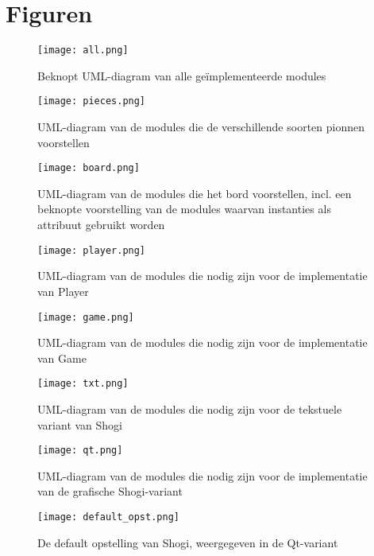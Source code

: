 \documentclass[a4paper,11pt,oneside, titlepage]{article}
\begin{document}
\section{Figuren}

\begin{figure}[hbp]
\texttt{[image: all.png]}
\caption{Beknopt UML-diagram van alle ge\"implementeerde modules}
\end{figure}
\clearpage

\begin{figure}[hbp]
\texttt{[image: pieces.png]}
\caption{UML-diagram van de modules die de verschillende soorten pionnen voorstellen}
\end{figure}
\clearpage

\begin{figure}[hbp]
\texttt{[image: board.png]}
\caption{UML-diagram van de modules die het bord voorstellen, incl. een beknopte voorstelling van de modules waarvan instanties als attribuut gebruikt worden}
\end{figure}
\clearpage

\begin{figure}[hbp]
\texttt{[image: player.png]}
\caption{UML-diagram van de modules die nodig zijn voor de implementatie van Player}
\end{figure}
\clearpage

\begin{figure}[hbp]
\texttt{[image: game.png]}
\caption{UML-diagram van de modules die nodig zijn voor de implementatie van Game}
\end{figure}
\clearpage

\begin{figure}[hbp]
\texttt{[image: txt.png]}
\caption{UML-diagram van de modules die nodig zijn voor de tekstuele variant van Shogi}
\end{figure}
\clearpage

\begin{figure}[hbp]
\texttt{[image: qt.png]}
\caption{UML-diagram van de modules die nodig zijn voor de implementatie van de grafische Shogi-variant}
\end{figure}
\clearpage

\begin{figure}[hbp]
\texttt{[image: default\_opst.png]}
\caption{De default opstelling van Shogi, weergegeven in de Qt-variant}
\end{figure}
\clearpage
\end{document}
